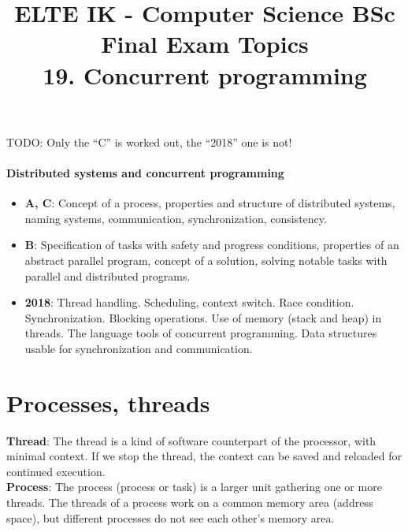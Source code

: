 \documentclass[margin=0px]{article}
\title{\textbf{{\Large ELTE IK - Computer Science BSc} \vspace{0.2cm} \\ {\huge Final Exam Topics}} \vspace{0.3cm} \\ 19. Concurrent programming}
\author{}
\date{}
\newenvironment{tetel}[1]{\paragraph{#1}}{}
\begin{document}
\maketitle

\begin{center}
\end{center}

TODO: Only the ``C'' is worked out, the ``2018'' one is not!

\begin{tetel}{Distributed systems and concurrent programming}
    \begin{itemize}
        \item[] \textbf{A, C}: Concept of a process, properties and structure of distributed systems, naming systems, communication, synchronization, consistency.
        \item[] \textbf{B}: Specification of tasks with safety and progress conditions, properties of an abstract parallel program, concept of a solution, solving notable tasks with parallel and distributed programs.
        \item[] \textbf{2018}: Thread handling. Scheduling, context switch. Race condition. Synchronization. Blocking operations. Use of memory (stack and heap) in threads. The language tools of concurrent programming. Data structures usable for synchronization and communication.
    \end{itemize}
\end{tetel}

\section{Processes, threads}

\noindent \textbf{Thread}: The thread is a kind of software counterpart of the processor, with minimal context. If we stop the thread,
the context can be saved and reloaded for continued execution.\\

\noindent \textbf{Process}: The process (process or task) is a larger unit gathering one or more threads. The threads of a
process work on a common memory area (address space), but different processes do not see each other's memory area.\\
\end{document}
